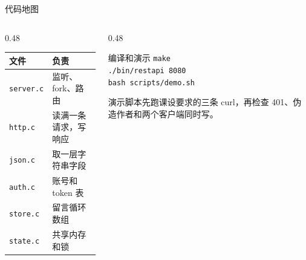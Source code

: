 \documentclass[aspectratio=169,11pt,professionalfonts]{ctexbeamer}
\begin{document}
\begin{frame}{代码地图}
\begin{columns}[T,onlytextwidth]
\begin{column}{0.48\textwidth}
{\small
\begin{tabular}{@{}ll@{}}
\toprule
文件 & 负责 \\
\midrule
\texttt{server.c} & 监听、fork、路由 \\
\texttt{http.c} & 读满一条请求，写响应 \\
\texttt{json.c} & 取一层字符串字段 \\
\texttt{auth.c} & 账号和 token 表 \\
\texttt{store.c} & 留言循环数组 \\
\texttt{state.c} & 共享内存和锁 \\
\bottomrule
\end{tabular}
}
\end{column}
\begin{column}{0.48\textwidth}
\begin{block}{编译和演示}
{\small
\texttt{make}\\
\texttt{./bin/restapi 8080}\\
\texttt{bash scripts/demo.sh}
}
\end{block}
\vspace{0.35em}
{\small 演示脚本先跑课设要求的三条 curl，再检查 401、伪造作者和两个客户端同时写。}
\end{column}
\end{columns}
\end{frame}
\end{document}
